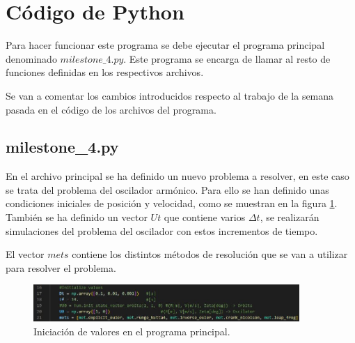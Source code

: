 \documentclass[12pt,a4paper]{article}
\begin{document}
\section{Código de Python}
Para hacer funcionar este programa se debe ejecutar el programa principal denominado $milestone\_4.py$. Este programa se encarga de llamar al resto de funciones definidas en los respectivos archivos.

Se van a comentar los cambios introducidos respecto al trabajo de la semana pasada en el código de los archivos del programa.


\subsection{milestone\_4.py}
En el archivo principal se ha definido un nuevo problema a resolver, en este caso se trata del problema del oscilador armónico. Para ello se han definido unas condiciones iniciales de posición y velocidad, como se muestran en la figura \ref{main2}. También se ha definido un vector $Ut$ que contiene varios $\Delta t$, se realizarán simulaciones del problema del oscilador con estos incrementos de tiempo. 

El vector $mets$ contiene los distintos métodos de resolución que se van a utilizar para resolver el problema. 
\begin{figure}[H]
	\centering
	\includegraphics[width=0.9\textwidth]{FIGURES/mil4/codigo/main2.JPG}
	\caption{Iniciación de valores en el programa principal.}
	\label{main2}
\end{figure}
\end{document}
